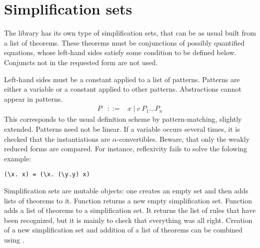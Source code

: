 \section{Simplification sets}

The  library has its own type of simplification sets, that
can be as usual built from a list of theorems. These theorems must be
conjunctions of possibly quantified equations, whose left-hand sides
satisfy some condition to be defined below. Conjuncts not in the
requested form are not used.

Left-hand sides must be a constant applied to a list of
patterns. Patterns are either a variable or a constant applied to
other patterns. Abstractions cannot appear in patterns.
\begin{eqnarray*}
P & ::= & x \mid c~P_1 \ldots P_n
\end{eqnarray*}
This corresponds to the usual definition scheme by pattern-matching,
slightly extended. Patterns need not be linear. If a variable occurs
several times, it is checked that the instantiations are
$\alpha$-convertibles. Beware, that only the weakly reduced forms are
compared. For instance, reflexivity fails to solve the folowing example:
\begin{verbatim}
(\x. x) = (\x. (\y.y) x)
\end{verbatim}


Simplification sets are mutable objects: one creates an empty set and
then adds lists of theorems to it. Function  returns a
new empty simplification set. Function  adds a list
of theorems to a simplification set. It returns the list of rules that
have been recognized, but it is mainly to check that everything was
all right. Creation of a new simplification set and addition of a list
of theorems can be combined using .
